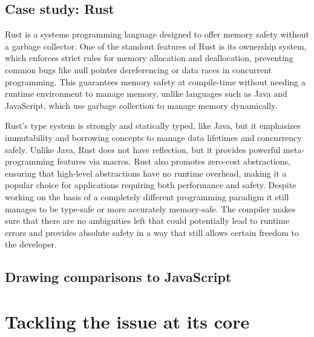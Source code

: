 \subsection{Case study: Rust}

Rust is a systems programming language designed to offer memory safety without a garbage collector. One of the standout features of Rust is its ownership system, which enforces strict rules for memory allocation and deallocation, preventing common bugs like null pointer dereferencing or data races in concurrent programming. This guarantees memory safety at compile-time without needing a runtime environment to manage memory, unlike languages such as Java and JavaScript, which use garbage collection to manage memory dynamically.

Rust's type system is strongly and statically typed, like Java, but it emphasizes immutability and borrowing concepts to manage data lifetimes and concurrency safely. Unlike Java, Rust does not have reflection, but it provides powerful meta-programming features via macros. Rust also promotes zero-cost abstractions, ensuring that high-level abstractions have no runtime overhead, making it a popular choice for applications requiring both performance and safety. Despite working on the basis of a completely different programming paradigm it still manages to be type-safe or more accurately memory-safe. The compiler makes sure that there are no ambiguities left that could potentially lead to runtime errors and provides absolute safety in a way that still allows certain freedom to the developer.

\subsection{Drawing comparisons to JavaScript}



\section{Tackling the issue at its core}
